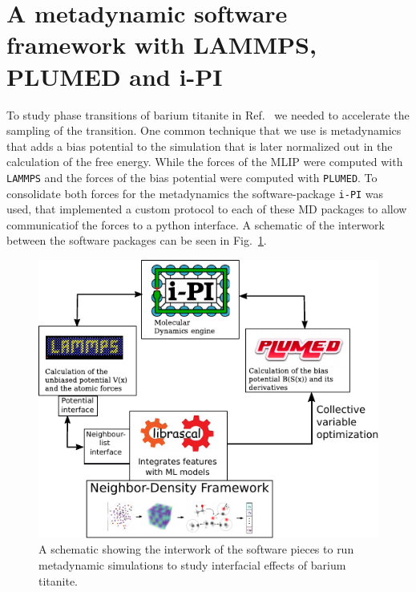\section{A metadynamic software framework with LAMMPS, PLUMED and i-PI}
To study phase transitions of barium titanite in Ref.~\cite{gigli2023modeling} we needed to accelerate the sampling of the transition.
One common technique that we use is metadynamics that adds a bias potential to the simulation that is later normalized out in the calculation of the free energy.
While the forces of the MLIP were computed with \texttt{LAMMPS} and the forces of the bias potential were computed with \texttt{PLUMED}\cite{PLUMED}.
To consolidate both forces for the metadynamics the software-package \texttt{i-PI} was used, that implemented a custom protocol to each of these MD packages to allow communicatiof the forces to a python interface.
A schematic of the interwork between the software packages can be seen in Fig.~\ref{fig:ipi-librascal-plumed}.
\begin{figure}
    \includegraphics[width=\textwidth]{fig/ipi-librascal-plumed.pdf}
    \caption{A schematic showing the interwork of the software pieces to run metadynamic simulations to study interfacial effects of barium titanite.}
    \label{fig:ipi-librascal-plumed}
\end{figure}

